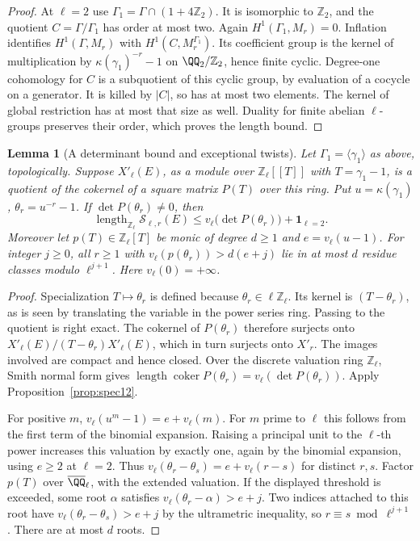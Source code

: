 \documentclass[a4paper,11pt]{article}
\newtheorem{lemma}[proposition]{Lemma}
\theoremstyle{definition}
\theoremstyle{remark}
\newcommand{\ZZ}{\mathbb Z}\newcommand{\ord}{\operatorname{ord}}
\newcommand{\len}{\operatorname{length}}\newcommand{\Res}{\operatorname*{Res}}
\numberwithin{equation}{section}
\begin{document}
\begin{proof}
At \(\ell=2\) use \(\Gamma_1=\Gamma\cap(1+4\ZZ_2)\). It is isomorphic to \(\ZZ_2\), and the quotient \(C=\Gamma/\Gamma_1\) has order at most two. Again \(H^1(\Gamma_1,M_r)=0\). Inflation identifies \(H^1(\Gamma,M_r)\) with \(H^1(C,M_r^{\Gamma_1})\). Its coefficient group is the kernel of multiplication by \(\kappa(\gamma_1)^{-r}-1\) on \(\QQ_2/\ZZ_2\), hence finite cyclic. Degree-one cohomology for \(C\) is a subquotient of this cyclic group, by evaluation of a cocycle on a generator. It is killed by \(|C|\), so has at most two elements. The kernel of global restriction has at most that size as well. Duality for finite abelian \(\ell\)-groups preserves their order, which proves the length bound.
\end{proof}

\begin{lemma}[A determinant bound and exceptional twists]\label{lem:det12}
Let \(\Gamma_1=\langle\gamma_1\rangle\) as above, topologically. Suppose \(X'_\ell(E)\), as a module over \(\ZZ_\ell[[T]]\) with \(T=\gamma_1-1\), is a quotient of the cokernel of a square matrix \(P(T)\) over this ring. Put \(u=\kappa(\gamma_1)\), \(\theta_r=u^{-r}-1\). If \(\det P(\theta_r)\ne0\), then
\[
  \len_{\ZZ_\ell}\mathcal S_{\ell,r}(E)
       \le v_\ell\big(\det P(\theta_r)\big)+\mathbf1_{\ell=2}.
\]
Moreover let \(p(T)\in\ZZ_\ell[T]\) be monic of degree \(d\ge1\) and \(e=v_\ell(u-1)\). For integer \(j\ge0\), all \(r\ge1\) with \(v_\ell(p(\theta_r))>d(e+j)\) lie in at most \(d\) residue classes modulo \(\ell^{j+1}\). Here \(v_\ell(0)=+\infty\).
\end{lemma}
\begin{proof}
Specialization \(T\mapsto\theta_r\) is defined because \(\theta_r\in\ell\ZZ_\ell\). Its kernel is \((T-\theta_r)\), as is seen by translating the variable in the power series ring. Passing to the quotient is right exact. The cokernel of \(P(\theta_r)\) therefore surjects onto \(X'_\ell(E)/(T-\theta_r)X'_\ell(E)\), which in turn surjects onto \(X'_r\). The images involved are compact and hence closed. Over the discrete valuation ring \(\ZZ_\ell\), Smith normal form gives \(\len\operatorname{coker}P(\theta_r)=v_\ell(\det P(\theta_r))\). Apply Proposition~\ref{prop:spec12}.

For positive \(m\), \(v_\ell(u^m-1)=e+v_\ell(m)\). For \(m\) prime to \(\ell\) this follows from the first term of the binomial expansion. Raising a principal unit to the \(\ell\)-th power increases this valuation by exactly one, again by the binomial expansion, using \(e\ge2\) at \(\ell=2\). Thus \(v_\ell(\theta_r-\theta_s)=e+v_\ell(r-s)\) for distinct \(r,s\). Factor \(p(T)\) over \(\overline{\QQ}_\ell\), with the extended valuation. If the displayed threshold is exceeded, some root \(\alpha\) satisfies \(v_\ell(\theta_r-\alpha)>e+j\). Two indices attached to this root have \(v_\ell(\theta_r-\theta_s)>e+j\) by the ultrametric inequality, so \(r\equiv s\bmod\ell^{j+1}\). There are at most \(d\) roots.
\end{proof}
\end{document}
